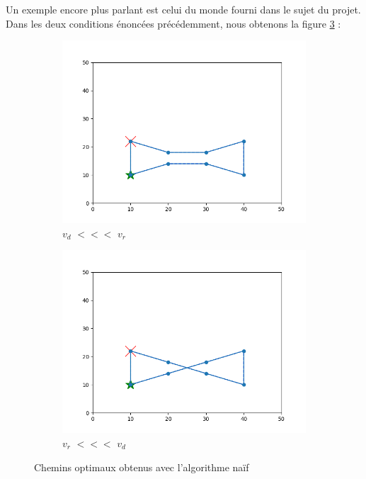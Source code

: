 \documentclass[12pt]{article}
\begin{document}
    \medskip

    Un exemple encore plus parlant est celui du monde fourni dans le sujet du projet. Dans les deux conditions énoncées précédemment, nous obtenons la figure \ref{fig:terrain2opt} :

    \begin{figure}[H]
        \centering
        \begin{subfigure}{0.35\textwidth}
          \centering
          \includegraphics[width=\linewidth]{img/2od}
          \caption{$v_d$ $<<<$ $v_r$}
          \label{subfig:terrain2od}
        \end{subfigure}
        \hfill
        \begin{subfigure}{0.35\textwidth}
          \centering
          \includegraphics[width=\linewidth]{img/2or}
          \caption{$v_r$ $<<<$ $v_d$}
          \label{subfig:terrain2or}
        \end{subfigure}
        \caption{Chemins optimaux obtenus avec l'algorithme naïf}
        \label{fig:terrain2opt}
    \end{figure}
\end{document}
